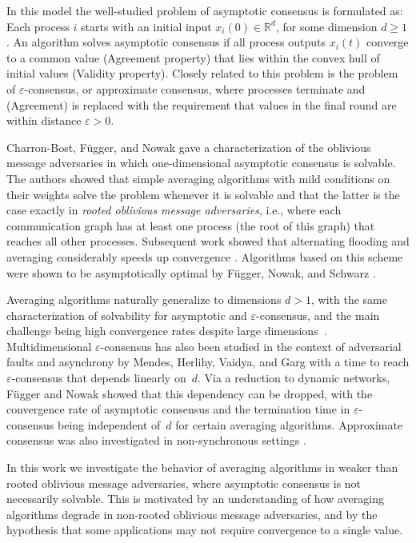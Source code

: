 \documentclass[a4paper,USenglish]{lipics-v2021}
\newcommand{\IR}{\mathbb{R}}
\renewcommand{\geq}{\geqslant}
\begin{document}
In this model the well-studied problem of asymptotic consensus is formulated as: Each process $i$ starts with an initial input $x_i(0) \in \IR^d$, for some dimension $d \geq 1$.
An algorithm solves asymptotic consensus if all process outputs $x_i(t)$ converge to a common value (Agreement property) that lies within the convex hull of initial values (Validity property).
Closely related to this problem is the problem of $\varepsilon$-consensus, or approximate consensus, where processes terminate and (Agreement) is replaced with the requirement that values in the final round are within distance $\varepsilon > 0$.

Charron-Bost, Függer, and Nowak \cite{CBFN15:icalp} gave a characterization of the oblivious message adversaries in which one-dimensional asymptotic consensus is solvable.
The authors showed that simple averaging algorithms with mild conditions on their weights solve the problem whenever it is solvable and that the latter is the case exactly in \emph{rooted oblivious message adversaries}, i.e., where each communication graph has at least one process (the root of this graph) that reaches all other processes.
Subsequent work showed that alternating flooding and averaging considerably speeds up convergence \cite{CBFN16:icalp}.
Algorithms based on this scheme were shown to be asymptotically optimal by F{\"u}gger, Nowak, and Schwarz \cite{fugger2021tight}.

Averaging algorithms naturally generalize to dimensions $d > 1$, with the same characterization of solvability for asymptotic and $\varepsilon$-consensus, and the main challenge being high convergence rates despite large dimensions~\cite{CBFN16:centroid,FN18:disc}.
Multidimensional $\varepsilon$-consensus has also been studied in the context of adversarial faults and asynchrony by Mendes, Herlihy, Vaidya, and Garg \cite{mendes15:multidimensional} with a time to reach $\varepsilon$-consensus that depends linearly on~$d$.
Via a reduction to dynamic networks, Függer and Nowak \cite{FN18:disc} showed that this dependency can be dropped, with the convergence rate of asymptotic consensus and the termination time in $\varepsilon$-consensus being independent of~$d$ for certain averaging algorithms.
Approximate consensus was also investigated in non-synchronous settings \cite{attiya2023step,ghinea2023multidimensional}.

In this work we investigate the behavior of averaging algorithms in weaker than rooted oblivious message adversaries,
where asymptotic consensus is not necessarily solvable.
This is motivated by an understanding of how averaging algorithms degrade in non-rooted oblivious message adversaries,
and by the hypothesis that some applications may not require convergence to a single value.
\end{document}

